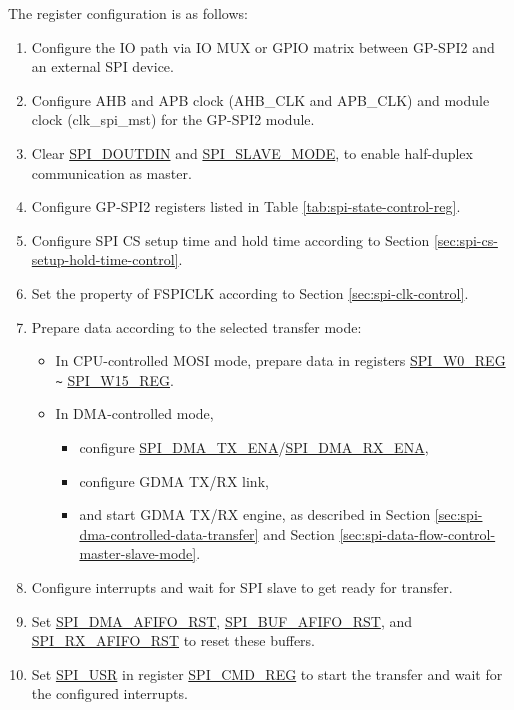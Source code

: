 \documentclass[main\_\_EN.tex]{subfiles}
\begin{document}
The register configuration is as follows:
\begin{enumerate}
    \item Configure the IO path via IO MUX or GPIO matrix between GP-SPI2 and an external SPI device.
    \item Configure AHB and APB clock (AHB\_CLK and APB\_CLK) and module clock (clk\_spi\_mst) for the GP-SPI2 module.

    \item Clear \hyperref[fielddesc:SPIDOUTDIN]{SPI\_DOUTDIN} and \hyperref[fielddesc:SPISLAVEMODE]{SPI\_SLAVE\_MODE}, to enable half-duplex communication as master.

    \item Configure GP-SPI2 registers listed in Table \ref{tab:spi-state-control-reg}.

    \item Configure SPI CS setup time and hold time according to Section \ref{sec:spi-cs-setup-hold-time-control}.

    \item Set the property of FSPICLK according to Section \ref{sec:spi-clk-control}.

    \item Prepare data according to the selected transfer mode:
    \begin{itemize}
        \item In CPU-controlled MOSI mode, prepare data in registers \hyperref[regdesc:SPIW0REG]{SPI\_W0\_REG} \verb+~+ \hyperref[regdesc:SPIW0REG]{SPI\_W15\_REG}.

        \item In DMA-controlled mode,
        \begin{itemize}
            \item configure \hyperref[fielddesc:SPIDMATXENA]{SPI\_DMA\_TX\_ENA}/\hyperref[fielddesc:SPIDMARXENA]{SPI\_DMA\_RX\_ENA},
            \item configure GDMA TX/RX link,
            \item and start GDMA TX/RX engine, as described in Section \ref{sec:spi-dma-controlled-data-transfer} and Section \ref{sec:spi-data-flow-control-master-slave-mode}.
        \end{itemize}
    \end{itemize}

    \item Configure interrupts and wait for SPI slave to get ready for transfer.

    \item Set \hyperref[fielddesc:SPIDMAAFIFORST]{SPI\_DMA\_AFIFO\_RST}, \hyperref[fielddesc:SPIBUFAFIFORST]{SPI\_BUF\_AFIFO\_RST}, and \hyperref[fielddesc:SPIRXAFIFORST]{SPI\_RX\_AFIFO\_RST} to reset these buffers.

    \item Set \hyperref[fielddesc:SPIUSR]{SPI\_USR} in register \hyperref[regdesc:SPICMDREG]{SPI\_CMD\_REG} to start the transfer and wait for the configured interrupts.
\end{enumerate}
\end{document}
